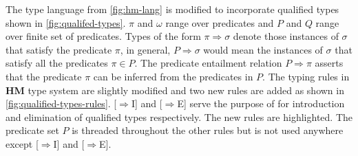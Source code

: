 The type language from \cref{fig:hm-lang} is modified to incorporate
qualified types shown in \cref{fig:qualifed-types}. $\pi$ and $\omega$ range over predicates and  $P$ and $Q$ range over finite set of predicates.
Types of the form $\pi \Rightarrow \sigma$ denote those instances of $\sigma$ that satisfy the predicate $\pi$, in general,
$P \Rightarrow \sigma$ would mean the instances of $\sigma$ that satisfy all the predicates $\pi \in P$. The predicate entailment
relation $P \Rightarrow \pi$ asserts that the predicate $\pi$ can be inferred from the predicates in $P$.
The typing rules in \textbf{HM} type system are slightly modified and two new rules are added
as shown in \cref{fig:qualified-types-rules}. [$\Rightarrow$I] and [$\Rightarrow$E] serve the purpose of for introduction and elimination of qualified types respectively.
The new rules are \colorbox{blue!30}{highlighted}. The predicate set $P$ is threaded throughout the other rules
but is not used anywhere except [$\Rightarrow$I] and [$\Rightarrow$E].

